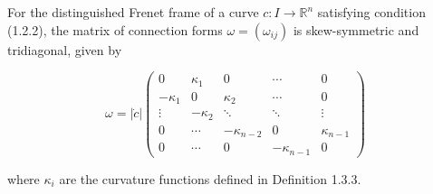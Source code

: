 For the distinguished Frenet frame of a curve $c: I \to \mathbb{R}^n$ satisfying condition (1.2.2), the matrix of connection forms $\omega = (\omega_{ij})$ is skew-symmetric and tridiagonal, given by

$$\omega = |\dot{c}| \begin{pmatrix}
0 & \kappa_1 & 0 & \cdots & 0 \\
-\kappa_1 & 0 & \kappa_2 & \cdots & 0 \\
\vdots & -\kappa_2 & \ddots & \ddots & \vdots \\
0 & \cdots & -\kappa_{n-2} & 0 & \kappa_{n-1} \\
0 & \cdots & 0 & -\kappa_{n-1} & 0
\end{pmatrix}$$

where $\kappa_i$ are the curvature functions defined in Definition 1.3.3.
